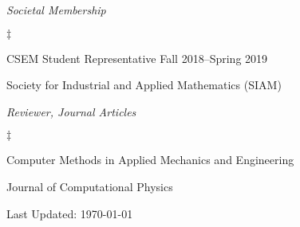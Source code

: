 \documentclass[margin,line]{res}
\newenvironment{list2}{
  \begin{list}{$\ddagger$}{%
      \setlength{\itemsep}{0in}
      \setlength{\parsep}{0in} \setlength{\parskip}{0in}
      \setlength{\topsep}{0in} \setlength{\partopsep}{0in}
      \setlength{\leftmargin}{0.2in}}}{\end{list}}
\begin{document}
\begin{resume}
\textit{Societal Membership}
\vspace{0.05in}
\begin{list2}
\item CSEM Student Representative \hfill Fall 2018--Spring 2019
\item Society for Industrial and Applied Mathematics (SIAM)
\end{list2}

\textit{Reviewer, Journal Articles}
\vspace{0.05in}
\begin{list2}
\item Computer Methods in Applied Mechanics and Engineering
\item Journal of Computational Physics
\end{list2}
\end{resume}
\vfill
\centerline{Last Updated: \today}
\end{document}
